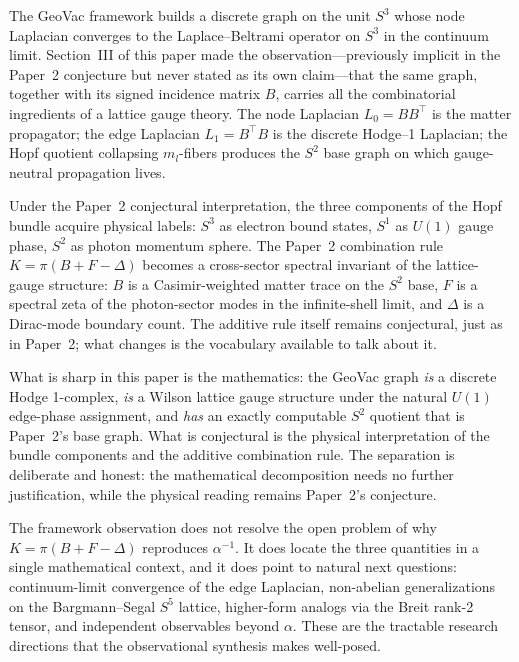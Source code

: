 \documentclass[aps,pra,twocolumn,superscriptaddress,longbibliography]{revtex4-2}
\begin{document}
The GeoVac framework builds a discrete graph on the unit $S^3$
whose node Laplacian converges to the Laplace--Beltrami operator on
$S^3$ in the continuum limit.  Section~III of this paper made the
observation---previously implicit in the Paper~2 conjecture but never
stated as its own claim---that the same graph, together with its
signed incidence matrix $B$, carries all the combinatorial
ingredients of a lattice gauge theory.  The node Laplacian
$L_0 = B B^{\top}$ is the matter propagator; the edge Laplacian
$L_1 = B^{\top} B$ is the discrete Hodge--1 Laplacian; the Hopf
quotient collapsing $m_l$-fibers produces the $S^2$ base graph on
which gauge-neutral propagation lives.

Under the Paper~2 conjectural interpretation, the three components
of the Hopf bundle acquire physical labels: $S^3$ as electron bound
states, $S^1$ as $U(1)$ gauge phase, $S^2$ as photon momentum sphere.
The Paper~2 combination rule $K = \pi(B + F - \Delta)$ becomes a
cross-sector spectral invariant of the lattice-gauge structure:
$B$ is a Casimir-weighted matter trace on the $S^2$ base, $F$ is a
spectral zeta of the photon-sector modes in the infinite-shell
limit, and $\Delta$ is a Dirac-mode boundary count.  The additive
rule itself remains conjectural, just as in Paper~2; what changes
is the vocabulary available to talk about it.

What is sharp in this paper is the mathematics: the GeoVac graph
\emph{is} a discrete Hodge 1-complex, \emph{is} a Wilson lattice
gauge structure under the natural $U(1)$ edge-phase assignment, and
\emph{has} an exactly computable $S^2$ quotient that is Paper~2's
base graph.  What is conjectural is the physical interpretation of
the bundle components and the additive combination rule.  The
separation is deliberate and honest: the mathematical decomposition
needs no further justification, while the physical reading remains
Paper~2's conjecture.

The framework observation does not resolve the open problem of why
$K = \pi(B + F - \Delta)$ reproduces $\alpha^{-1}$.  It does locate
the three quantities in a single mathematical context, and it does
point to natural next questions: continuum-limit convergence of the
edge Laplacian, non-abelian generalizations on the Bargmann--Segal
$S^5$ lattice, higher-form analogs via the Breit rank-2 tensor, and
independent observables beyond $\alpha$.  These are the tractable
research directions that the observational synthesis makes
well-posed.
\end{document}
